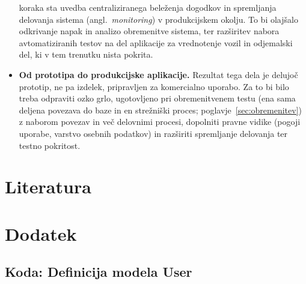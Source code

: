\documentclass[a4paper,12pt,openright]{book}
\begin{document}
\begin{itemize}
    koraka sta uvedba centraliziranega beleženja dogodkov in spremljanja delovanja sistema
    (angl.\ \emph{monitoring}) v produkcijskem okolju. To bi olajšalo odkrivanje napak in
    analizo obremenitve sistema, ter razširitev nabora avtomatiziranih testov na
    del aplikacije za vrednotenje vozil in odjemalski del, ki v tem trenutku nista pokrita.
    \item \textbf{Od prototipa do produkcijske aplikacije.} Rezultat tega dela je delujoč
    prototip, ne pa izdelek, pripravljen za komercialno uporabo. Za to bi bilo treba odpraviti
    ozko grlo, ugotovljeno pri obremenitvenem testu (ena sama deljena povezava do baze in
    en strežniški proces; poglavje~\ref{sec:obremenitev}) z naborom povezav in več delovnimi
    procesi, dopolniti pravne vidike (pogoji
    uporabe, varstvo osebnih podatkov) in razširiti spremljanje delovanja ter testno
    pokritost.
\end{itemize}



\chapter*{Literatura}

\printbibliography[
  type=article,
  title={Članki v revijah},
  heading=subbibintoc
]
\newpage
\printbibliography[
  type=inproceedings,
  title={Članki v zbornikih konferenc},
  heading=subbibintoc
]
\newpage
\printbibliography[
  filter=ostalo,
  title={Ostala literatura},
  heading=subbibintoc
]

\chapter*{Dodatek}

\section*{Koda: Definicija modela User}
\end{document}
